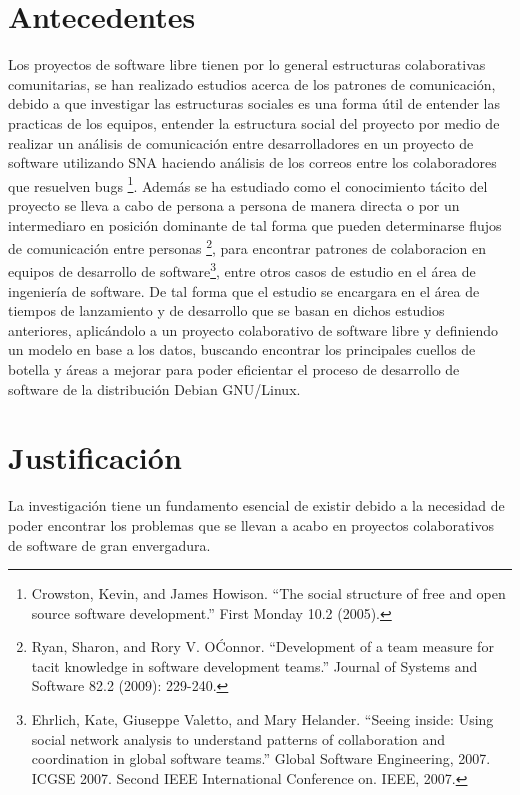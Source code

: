 \documentclass[12pt]{report}
\begin{document}
\chapter*{Antecedentes} Los proyectos de software libre tienen por lo
general estructuras colaborativas comunitarias, se han realizado
estudios acerca de los patrones de comunicación, debido
a que investigar las estructuras sociales es una forma útil de
entender las practicas de los equipos, entender la estructura social
del proyecto por medio de realizar un análisis de comunicación entre
desarrolladores en un proyecto de software utilizando SNA haciendo análisis
de los correos entre los colaboradores que resuelven bugs \footnote{Crowston, Kevin,
  and James Howison.  ``The social structure of free and open source
  software development.''  First Monday 10.2 (2005).}. Además se ha estudiado
como el conocimiento tácito del proyecto se lleva a cabo de persona a
persona de manera directa o por un intermediaro en posición dominante 
de tal forma que pueden determinarse flujos de comunicación entre personas
\footnote{Ryan, Sharon, and Rory
  V. O\'Connor. ``Development of a team measure for tacit knowledge in
  software development teams.''  Journal of Systems and Software 82.2
  (2009): 229-240.}, para encontrar patrones de colaboracion en
equipos de desarrollo de software\footnote{Ehrlich, Kate, Giuseppe
  Valetto, and Mary Helander.  ``Seeing inside: Using social network
  analysis to understand patterns of collaboration and coordination in
  global software teams.''  Global Software Engineering, 2007.  ICGSE
  2007.  Second IEEE International Conference on. IEEE, 2007.}, entre
otros casos de estudio en el área de ingeniería de software. De tal
forma que el estudio se encargara en el área de tiempos de lanzamiento
y de desarrollo que se basan en dichos estudios anteriores,
aplicándolo a un proyecto colaborativo de software libre y definiendo
un modelo en base a los datos, buscando encontrar los principales
cuellos de botella y áreas a mejorar para poder eficientar el proceso
de desarrollo de software de la distribución Debian GNU/Linux.

\chapter*{Justificación} La investigación tiene un fundamento esencial
de existir debido a la necesidad  de poder encontrar los problemas que
se  llevan a  acabo en  proyectos  colaborativos de  software de  gran
envergadura.
\end{document}
